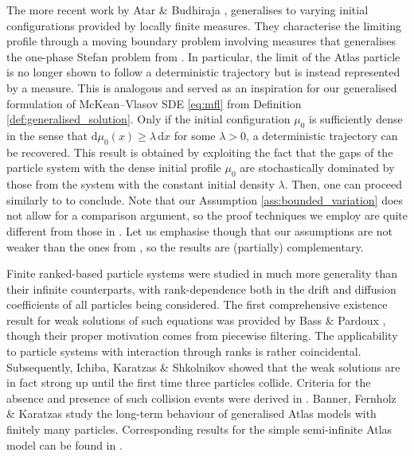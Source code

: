\documentclass[11pt, a4paper]{article}
\theoremstyle{plain}
\theoremstyle{definition}
\theoremstyle{remark}
\numberwithin{equation}{section}
\renewcommand{\d}{\mathrm{d}}
\begin{document}
The more recent work by Atar \& Budhiraja \cite{atar_atlas_2025}, generalises \cite{cabezas_rank_2019} to varying initial configurations provided by locally finite measures. They characterise the limiting profile through a moving boundary problem involving measures that generalises the one-phase Stefan problem from \cite{cabezas_rank_2019}. In particular, the limit of the Atlas particle is no longer shown to follow a deterministic trajectory but is instead represented by a measure. This is analogous and served as an inspiration for our generalised formulation of McKean--Vlasov SDE \eqref{eq:mfl} from Definition \ref{def:generalised_solution}. Only if the initial configuration $\mu_0$ is sufficiently dense in the sense that $\d \mu_0(x) \geq \lambda \, \d x$ for some $\lambda > 0$, a deterministic trajectory can be recovered. This result is obtained by exploiting the fact that the gaps of the particle system with the dense initial profile $\mu_0$ are stochastically dominated by those from the system with the constant initial density $\lambda$. Then, one can proceed similarly to \cite{cabezas_rank_2019} to conclude. Note that our Assumption \ref{ass:bounded_variation} does not allow for a comparison argument, so the proof techniques we employ are quite different from those in \cite{atar_atlas_2025}. Let us emphasise though that our assumptions are not weaker than the ones from \cite{atar_atlas_2025}, so the results are (partially) complementary.  

Finite ranked-based particle systems were studied in much more generality than their infinite counterparts, with rank-dependence both in the drift and diffusion coefficients of all particles being considered. The first comprehensive existence result for weak solutions of such equations was provided by Bass \& Pardoux \cite{bass_uniqueness_piecewise_1987}, though their proper motivation comes from piecewise filtering. The applicability to particle systems with interaction through ranks is rather coincidental. Subsequently, Ichiba, Karatzas \& Shkolnikov \cite{ichiba_ranked_2012} showed that the weak solutions are in fact strong up until the first time three particles collide. Criteria for the absence and presence of such collision events were derived in \cite{ichiba_ranked_2010, ichiba_ranked_2012, sarantsev_triple_2015}. Banner, Fernholz \& Karatzas \cite{banner_atlas_2005} study the long-term behaviour of generalised Atlas models with finitely many particles. Corresponding results for the simple semi-infinite Atlas model can be found in \cite{pal_ranked_bm_2008, sarantsev_atlas_2017}.
\end{document}
